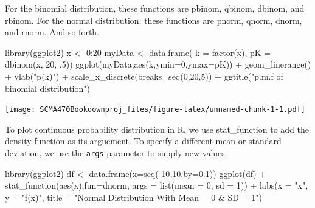 \documentclass[
]{book}
\newenvironment{Shaded}{\begin{snugshade}}{\end{snugshade}}
\newcommand{\AttributeTok}[1]{\textcolor[rgb]{0.77,0.63,0.00}{#1}}
\newcommand{\DecValTok}[1]{\textcolor[rgb]{0.00,0.00,0.81}{#1}}
\newcommand{\FloatTok}[1]{\textcolor[rgb]{0.00,0.00,0.81}{#1}}
\newcommand{\FunctionTok}[1]{\textcolor[rgb]{0.00,0.00,0.00}{#1}}
\newcommand{\NormalTok}[1]{#1}
\newcommand{\OtherTok}[1]{\textcolor[rgb]{0.56,0.35,0.01}{#1}}
\newcommand{\SpecialCharTok}[1]{\textcolor[rgb]{0.00,0.00,0.00}{#1}}
\newcommand{\StringTok}[1]{\textcolor[rgb]{0.31,0.60,0.02}{#1}}
\theoremstyle{definition}
\theoremstyle{definition}
\theoremstyle{definition}
\theoremstyle{definition}
\theoremstyle{remark}
\begin{document}
For the binomial distribution, these functions are pbinom, qbinom, dbinom, and rbinom. For the normal distribution, these functions are pnorm, qnorm, dnorm, and rnorm. And so forth.

\begin{Shaded}
\begin{Highlighting}[]
\FunctionTok{library}\NormalTok{(ggplot2)}
\NormalTok{x }\OtherTok{\textless{}{-}} \DecValTok{0}\SpecialCharTok{:}\DecValTok{20}
\NormalTok{myData }\OtherTok{\textless{}{-}} \FunctionTok{data.frame}\NormalTok{( }\AttributeTok{k =} \FunctionTok{factor}\NormalTok{(x), }\AttributeTok{pK =} \FunctionTok{dbinom}\NormalTok{(x, }\DecValTok{20}\NormalTok{, .}\DecValTok{5}\NormalTok{))}
\FunctionTok{ggplot}\NormalTok{(myData,}\FunctionTok{aes}\NormalTok{(k,}\AttributeTok{ymin=}\DecValTok{0}\NormalTok{,}\AttributeTok{ymax=}\NormalTok{pK)) }\SpecialCharTok{+} 
  \FunctionTok{geom\_linerange}\NormalTok{() }\SpecialCharTok{+} \FunctionTok{ylab}\NormalTok{(}\StringTok{"p(k)"}\NormalTok{) }\SpecialCharTok{+}
  \FunctionTok{scale\_x\_discrete}\NormalTok{(}\AttributeTok{breaks=}\FunctionTok{seq}\NormalTok{(}\DecValTok{0}\NormalTok{,}\DecValTok{20}\NormalTok{,}\DecValTok{5}\NormalTok{)) }\SpecialCharTok{+}   
  \FunctionTok{ggtitle}\NormalTok{(}\StringTok{"p.m.f of binomial distribution"}\NormalTok{)}
\end{Highlighting}
\end{Shaded}

\texttt{[image: SCMA470Bookdownproj\_files/figure-latex/unnamed-chunk-1-1.pdf]}

To plot continuous probability distribution in R, we use stat\_function to add the density function as its arguement. To specify a different mean or standard deviation, we use the \texttt{args} parameter to supply new values.

\begin{Shaded}
\begin{Highlighting}[]
\FunctionTok{library}\NormalTok{(ggplot2)}
\NormalTok{df }\OtherTok{\textless{}{-}} \FunctionTok{data.frame}\NormalTok{(}\AttributeTok{x=}\FunctionTok{seq}\NormalTok{(}\SpecialCharTok{{-}}\DecValTok{10}\NormalTok{,}\DecValTok{10}\NormalTok{,}\AttributeTok{by=}\FloatTok{0.1}\NormalTok{))}
\FunctionTok{ggplot}\NormalTok{(df) }\SpecialCharTok{+} 
    \FunctionTok{stat\_function}\NormalTok{(}\FunctionTok{aes}\NormalTok{(x),}\AttributeTok{fun=}\NormalTok{dnorm, }\AttributeTok{args =} \FunctionTok{list}\NormalTok{(}\AttributeTok{mean =} \DecValTok{0}\NormalTok{, }\AttributeTok{sd =} \DecValTok{1}\NormalTok{))  }\SpecialCharTok{+} 
    \FunctionTok{labs}\NormalTok{(}\AttributeTok{x =} \StringTok{"x"}\NormalTok{, }\AttributeTok{y =} \StringTok{"f(x)"}\NormalTok{, }
       \AttributeTok{title =} \StringTok{"Normal Distribution With Mean = 0 \& SD = 1"}\NormalTok{) }
\end{Highlighting}
\end{Shaded}
\end{document}
